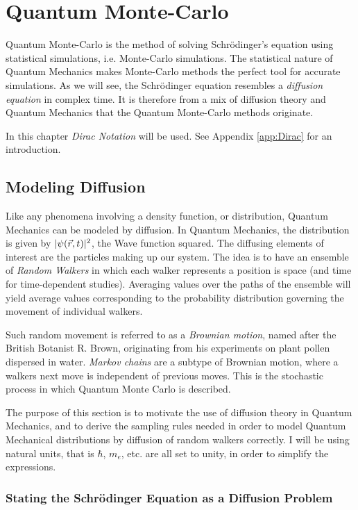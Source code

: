 \chapter{Quantum Monte-Carlo}
\label{ch:QMC}

Quantum Monte-Carlo is the method of solving Schrödinger's equation using statistical simulations, i.e. Monte-Carlo simulations. The statistical nature of Quantum Mechanics makes Monte-Carlo methods the perfect tool for accurate simulations. As we will see, the Schrödinger equation resembles a \textit{diffusion equation} in complex time. It is therefore from a mix of diffusion theory and Quantum Mechanics that the Quantum Monte-Carlo methods originate.

In this chapter \textit{Dirac Notation} will be used. See Appendix \ref{app:Dirac} for an introduction.

\section{Modeling Diffusion}

Like any phenomena involving a density function, or distribution, Quantum Mechanics can be modeled by diffusion. In Quantum Mechanics, the distribution is given by $|\psi(\vec r, t)|^2$, the Wave function squared. The diffusing elements of interest are the particles making up our system. The idea is to have an ensemble of \textit{Random Walkers} in which each walker represents a position is space (and time for time-dependent studies). Averaging values over the paths of the ensemble will yield average values corresponding to the probability distribution governing the movement of individual walkers. 

Such random movement is referred to as a \textit{Brownian motion}, named after the British Botanist R. Brown, originating from his experiments on plant pollen dispersed in water. \textit{Markov chains} are a subtype of Brownian motion, where a walkers next move is independent of previous moves. This is the stochastic process in which Quantum Monte Carlo is described.

The purpose of this section is to motivate the use of diffusion theory in Quantum Mechanics, and to derive the sampling rules needed in order to model Quantum Mechanical distributions by diffusion of random walkers correctly. I will be using natural units, that is $\hbar$, $m_e$, etc. are all set to unity, in order to simplify the expressions.

\subsection{Stating the Schrödinger Equation as a Diffusion Problem}
\label{sec:statingDiff}

